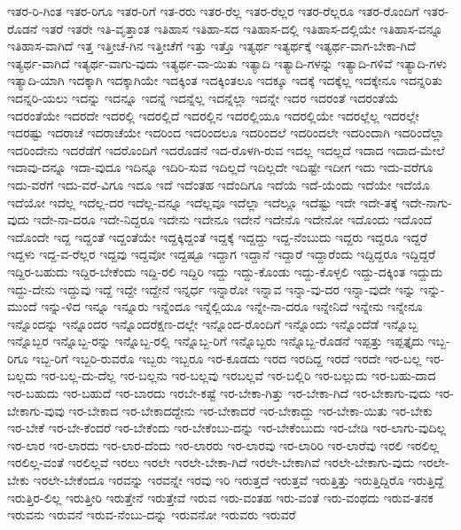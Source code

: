 {ಇತರ-ರಿ-ಗಿಂತ
ಇತರ-ರಿಗೂ
ಇತರ-ರಿಗೆ
ಇತ-ರರು
ಇತರ-ರೆಲ್ಲ
ಇತರ-ರೆಲ್ಲರ
ಇತರ-ರೆಲ್ಲರೂ
ಇತರ-ರೊಂದಿಗೆ
ಇತರ-ರೊಡನೆ
ಇತರೆ
ಇತರೇ
ಇತಿ-ವೃತ್ತಾಂತ
ಇತಿಹಾಸ
ಇತಿಹಾ-ಸದ
ಇತಿಹಾಸ-ದಲ್ಲಿ
ಇತಿಹಾಸ-ದಲ್ಲಿಯೇ
ಇತಿಹಾಸ-ವನ್ನೂ
ಇತಿಹಾಸ-ವಾಗಿದೆ
ಇತ್ತ
ಇತ್ತೀಚೆ-ಗಿನ
ಇತ್ತೀಚೆಗೆ
ಇತ್ತು
ಇತ್ತೊ
ಇತ್ಯರ್ಥ
ಇತ್ಯರ್ಥಕ್ಕೆ
ಇತ್ಯರ್ಥ-ವಾಗ-ಬೇಕಾ-ಗಿದೆ
ಇತ್ಯರ್ಥ-ವಾಗಿದೆ
ಇತ್ಯರ್ಥ-ವಾಗು-ವುದು
ಇತ್ಯರ್ಥ-ವಾ-ಯಿತು
ಇತ್ಯಾದಿ
ಇತ್ಯಾದಿ-ಗಳನ್ನು
ಇತ್ಯಾದಿ-ಗಳಿವೆ
ಇತ್ಯಾದಿ-ಗಳು
ಇತ್ಯಾದಿ-ಯಾಗಿ
ಇದಕ್ಕಾಗಿ
ಇದಕ್ಕಾಗಿಯೇ
ಇದಕ್ಕಿಂತ
ಇದಕ್ಕಿಂತಲೂ
ಇದಕ್ಕೂ
ಇದಕ್ಕೆ
ಇದಕ್ಕೆಲ್ಲ
ಇದಕ್ಕೇನೂ
ಇದನ್ನರಿತು
ಇದನ್ನರಿ-ಯಲು
ಇದನ್ನು
ಇದನ್ನೂ
ಇದನ್ನೆ
ಇದನ್ನೆಲ್ಲ
ಇದನ್ನೆಲ್ಲಾ
ಇದನ್ನೇ
ಇದರ
ಇದರಂತೆ
ಇದರಂತೆಯೆ
ಇದರಂತೆಯೇ
ಇದರದೇ
ಇದರಲ್ಲಿ
ಇದರಲ್ಲಿದೆ
ಇದರಲ್ಲಿನ
ಇದರಲ್ಲಿಯೂ
ಇದರಲ್ಲಿಯೇ
ಇದರಲ್ಲೆಲ್ಲ
ಇದರಲ್ಲೇ
ಇದರಷ್ಟು
ಇದರಾಚೆ
ಇದರಾಚೆಯೇ
ಇದರಿಂದ
ಇದರಿಂದಲೂ
ಇದರಿಂದಲೆ
ಇದರಿಂದಲೇ
ಇದರಿಂದಾಗಿ
ಇದರಿಂದೆಲ್ಲಾ
ಇದರಿಂದೇನು
ಇದರೆಡೆಗೆ
ಇದರೊಂದಿಗೆ
ಇದರೊಡನೆ
ಇದ-ರೊಳಗಿ-ರುವ
ಇದಲ್ಲ
ಇದಲ್ಲದೆ
ಇದಾದ
ಇದಾದ-ಮೇಲೆ
ಇದಾವು-ದನ್ನೂ
ಇದಾ-ವುದೂ
ಇದಿನ್ನೂ
ಇದಿರಿ-ಸುವ
ಇದಿಲ್ಲದೆ
ಇದಿಲ್ಲದೇ
ಇದಿಷ್ಟೇ
ಇದೀಗ
ಇದು
ಇದು-ವರೆಗೂ
ಇದು-ವರೆಗೆ
ಇದು-ವರೆ-ವಿಗೂ
ಇದೂ
ಇದೆ
ಇದೆಂತಹ
ಇದೆಂದಿಗೂ
ಇದೆಯೆ
ಇದೆ-ಯೆಂದು
ಇದೆಯೇ
ಇದೆಯೊ
ಇದೆಯೋ
ಇದೆಲ್ಲ
ಇದೆಲ್ಲ-ದರ
ಇದೆಲ್ಲ-ವನ್ನೂ
ಇದೆಲ್ಲವೂ
ಇದೆಲ್ಲಾ
ಇದೆಲ್ಲೂ
ಇದೆಷ್ಟು
ಇದೇ
ಇದೇ-ತಕ್ಕೆ
ಇದೇ-ನಾಗು-ವುದು
ಇದೇ-ನಾ-ದರೂ
ಇದೇ-ನಿದ್ದರೂ
ಇದೇನು
ಇದೇನೂ
ಇದೇನೆ
ಇದೇನೊ
ಇದೇನೋ
ಇದೊಂದು
ಇದೊಂದೆ
ಇದೊಂದೇ
ಇದ್ದ
ಇದ್ದಂತೆ
ಇದ್ದಂತೆಯೇ
ಇದ್ದಕ್ಕಿದ್ದಂತೆ
ಇದ್ದಕ್ಕೆ
ಇದ್ದದ್ದು
ಇದ್ದ-ನೆಂಬುದು
ಇದ್ದರು
ಇದ್ದರೂ
ಇದ್ದರೆ
ಇದ್ದಳು
ಇದ್ದ-ವ-ರೆಲ್ಲರ
ಇದ್ದವು
ಇದ್ದವೋ
ಇದ್ದಷ್ಟೂ
ಇದ್ದಾಗ
ಇದ್ದಾನೆ
ಇದ್ದಾರೆ
ಇದ್ದಾರೆಂದು
ಇದ್ದಿದ್ದರೂ
ಇದ್ದಿದ್ದರೆ
ಇದ್ದಿರ-ಬಹುದು
ಇದ್ದಿರ-ಬೇಕೆಂದು
ಇದ್ದಿ-ರಲಿ
ಇದ್ದಿರಿ
ಇದ್ದು
ಇದ್ದು-ಕೊಂಡು
ಇದ್ದು-ಕೊಳ್ಳಲಿ
ಇದ್ದು-ದಕ್ಕಿಂತ
ಇದ್ದುದು
ಇದ್ದು-ದೇನು
ಇದ್ದುವು
ಇದ್ದೆ
ಇದ್ದೇ
ಇದ್ದೇನೆ
ಇನ್ನರ್ಧ
ಇನ್ನಾರೋ
ಇನ್ನಾವ
ಇನ್ನಾ-ವು-ದರ
ಇನ್ನಾ-ವುದೇ
ಇನ್ನು
ಇನ್ನು-ಮುಂದೆ
ಇನ್ನು-ಳಿದ
ಇನ್ನೂ
ಇನ್ನೂರು
ಇನ್ನೆಂದೂ
ಇನ್ನೆಲ್ಲಿಯೂ
ಇನ್ನೇ-ನಾ-ದರೂ
ಇನ್ನೇನಿದೆ
ಇನ್ನೇನು
ಇನ್ನೇನೂ
ಇನ್ನೊಂದನ್ನು
ಇನ್ನೊಂದರ
ಇನ್ನೊಂದರೆಕ್ಷಣ-ದಲ್ಲೇ
ಇನ್ನೊಂದ-ರೊಂದಿಗೆ
ಇನ್ನೊಂದು
ಇನ್ನೊಂದೆಡೆ
ಇನ್ನೊಬ್ಬ
ಇನ್ನೊಬ್ಬರ
ಇನ್ನೊಬ್ಬ-ರನ್ನು
ಇನ್ನೊಬ್ಬ-ರಲ್ಲಿ
ಇನ್ನೊಬ್ಬ-ರಿಗೆ
ಇನ್ನೊಬ್ಬರು
ಇನ್ನೊಬ್ಬ-ರೊಡನೆ
ಇಪ್ಪತ್ತು
ಇಪ್ಪತ್ತೈದು
ಇಬ್ಬ-ರಿಗೂ
ಇಬ್ಬ-ರಿಗೆ
ಇಬ್ಬರಿ-ರುವರೊ
ಇಬ್ಬರು
ಇಬ್ಬರೂ
ಇರ-ಕೂಡದು
ಇರದ
ಇರದಿದ್ದ
ಇರದೆ
ಇರದೇ
ಇರ-ಬಲ್ಲ
ಇರ-ಬಲ್ಲದು
ಇರ-ಬಲ್ಲ-ದು-ದೆಲ್ಲ
ಇರ-ಬಲ್ಲನು
ಇರ-ಬಲ್ಲವು
ಇರಬಲ್ಲವೆ
ಇರ-ಬಲ್ಲಿರಿ
ಇರ-ಬಲ್ಲುದು
ಇರ-ಬಹು-ದಾದ
ಇರ-ಬಹುದು
ಇರ-ಬಹುದೆ
ಇರ-ಬಾರದು
ಇರಬೇ-ಕಷ್ಟೆ
ಇರ-ಬೇಕಾ-ಗಿತ್ತು
ಇರ-ಬೇಕಾ-ಗಿದೆ
ಇರ-ಬೇಕಾಗು-ವುದು
ಇರ-ಬೇಕಾಗು-ವುವು
ಇರ-ಬೇಕಾದ
ಇರ-ಬೇಕಾದದ್ದೇನು
ಇರ-ಬೇಕಾದರೆ
ಇರ-ಬೇಕಾದ್ದು
ಇರ-ಬೇಕಾ-ಯಿತು
ಇರ-ಬೇಕು
ಇರ-ಬೇಕೆ
ಇರ-ಬೇ-ಕೆಂದರೆ
ಇರ-ಬೇಕೆಂದು
ಇರ-ಬೇಕೆಂಬು-ದನ್ನು
ಇರ-ಬೇಕೆಂಬುದು
ಇರ-ಬೇಡಿ
ಇರ-ಲಾಗು-ವುದಿಲ್ಲ
ಇರ-ಲಾರ
ಇರ-ಲಾರದು
ಇರ-ಲಾರ-ದೆಂದು
ಇರ-ಲಾರರು
ಇರ-ಲಾರವು
ಇರ-ಲಾರಿರಿ
ಇರ-ಲಾರೆವು
ಇರಲಿ
ಇರಲಿಲ್ಲ
ಇರಲಿಲ್ಲ-ವಂತೆ
ಇರಲಿಲ್ಲವೆ
ಇರಲು
ಇರಲೇ
ಇರಲೇ-ಬೇಕಾ-ಗಿದೆ
ಇರಲೇ-ಬೇಕಾಗಿವೆ
ಇರಲೇ-ಬೇಕಾಗು-ವುದು
ಇರಲೇ-ಬೇಕು
ಇರಲೇ-ಬೇಕೆಂದೂ
ಇರವನ್ನು
ಇರವನ್ನೇ
ಇರವು
ಇರಿ
ಇರುತ್ತದೆ
ಇರುತ್ತವೆ
ಇರುತ್ತಿತ್ತು
ಇರುತ್ತಿದ್ದಿರೊ
ಇರುತ್ತಿದ್ದೆ
ಇರುತ್ತಿರ-ಲಿಲ್ಲ
ಇರುತ್ತೀರಿ
ಇರುತ್ತೇನೆ
ಇರುತ್ತೇವೆ
ಇರುವ
ಇರು-ವಂತಹ
ಇರು-ವಂತೆ
ಇರು-ವಂಥದು
ಇರುವ-ತನಕ
ಇರುವನು
ಇರುವನೆ
ಇರುವ-ನೆಂಬು-ದನ್ನು
ಇರುವನೋ
ಇರುವರು
ಇರುವರೆ
}
